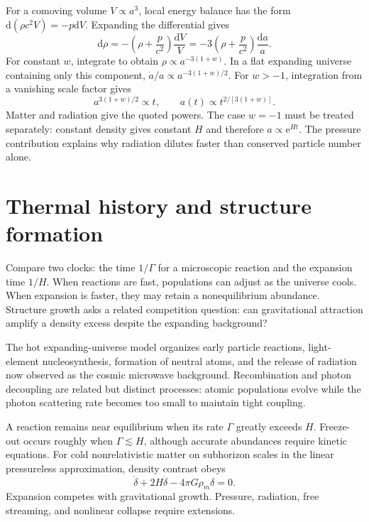 \documentclass[11pt,oneside]{book}
\newcommand{\dd}{\mathrm{d}}
\newcommand{\ee}{\mathrm{e}}
\theoremstyle{reviewstyle}
\begin{document}
For a comoving volume $V\propto a^3$, local energy balance has the form $\dd(\rho c^2V)=-p\dd V$. Expanding the differential gives
\begin{equation}
\dd\rho=-\left(\rho+\frac p{c^2}\right)\frac{\dd V}{V}
=-3\left(\rho+\frac p{c^2}\right)\frac{\dd a}{a}.
\end{equation}
For constant $w$, integrate to obtain $\rho\propto a^{-3(1+w)}$. In a flat expanding universe containing only this component, $\dot a/a\propto a^{-3(1+w)/2}$. For $w>-1$, integration from a vanishing scale factor gives
\begin{equation}
a^{3(1+w)/2}\propto t,
\qquad a(t)\propto t^{2/[3(1+w)]}.
\end{equation}
Matter and radiation give the quoted powers. The case $w=-1$ must be treated separately: constant density gives constant $H$ and therefore $a\propto\ee^{Ht}$. The pressure contribution explains why radiation dilutes faster than conserved particle number alone.

\section{Thermal history and structure formation}
Compare two clocks: the time $1/\Gamma$ for a microscopic reaction and the expansion time $1/H$. When reactions are fast, populations can adjust as the universe cools. When expansion is faster, they may retain a nonequilibrium abundance. Structure growth asks a related competition question: can gravitational attraction amplify a density excess despite the expanding background?

The hot expanding-universe model organizes early particle reactions, light-element nucleosynthesis, formation of neutral atoms, and the release of radiation now observed as the cosmic microwave background. Recombination and photon decoupling are related but distinct processes: atomic populations evolve while the photon scattering rate becomes too small to maintain tight coupling.

A reaction remains near equilibrium when its rate $\Gamma$ greatly exceeds $H$. Freeze-out occurs roughly when $\Gamma\lesssim H$, although accurate abundances require kinetic equations. For cold nonrelativistic matter on subhorizon scales in the linear pressureless approximation, density contrast obeys
\begin{equation}\ddot\delta+2H\dot\delta-4\pi G\rho_m\delta=0.\end{equation}
Expansion competes with gravitational growth. Pressure, radiation, free streaming, and nonlinear collapse require extensions.
\end{document}
